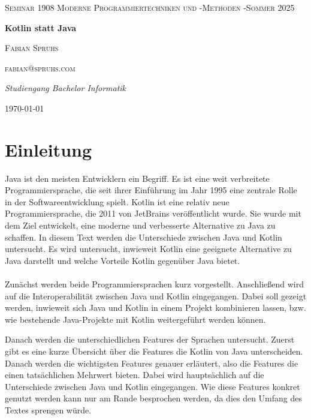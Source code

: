 \documentclass[11pt]{article}
\begin{document}
    \begin{titlepage}
        \centering
        {\scshape\LARGE Seminar 1908 Moderne Programmiertechniken und -Methoden -Sommer 2025 \par}
        \vspace{1cm}
        {\huge\bfseries Kotlin statt Java\par}
        \vspace{1.5cm}
        {\scshape\Large Fabian Spruhs\par}
        {\scshape fabian@spruhs.com\par}
        \vspace{2cm}
        {\Large\itshape Studiengang Bachelor Informatik\par}
        \vspace{2cm}


        {\large \today\par}
    \end{titlepage}

    \tableofcontents
    \newpage


    \section{Einleitung}
    Java ist den meisten Entwicklern ein Begriff.
    Es ist eine weit verbreitete Programmiersprache, die seit ihrer Einführung im Jahr 1995 eine zentrale Rolle in der Softwareentwicklung spielt.
    Kotlin ist eine relativ neue Programmiersprache, die 2011 von JetBrains veröffentlicht wurde.
    Sie wurde mit dem Ziel entwickelt, eine moderne und verbesserte Alternative zu Java zu schaffen.
    In diesem Text werden die Unterschiede zwischen Java und Kotlin untersucht.
    Es wird untersucht, inwieweit Kotlin eine geeignete Alternative zu Java darstellt und welche Vorteile Kotlin gegenüber Java bietet.\\
    \\
    Zunächst werden beide Programmiersprachen kurz vorgestellt.
    Anschließend wird auf die Interoperabilität zwischen Java und Kotlin eingegangen.
    Dabei soll gezeigt werden, inwieweit sich Java und Kotlin in einem Projekt kombinieren lassen, bzw. wie bestehende Java-Projekte mit Kotlin weitergeführt werden können.

    Danach werden die unterschiedlichen Features der Sprachen untersucht.
    Zuerst gibt es eine kurze Übersicht über die Features die Kotlin von Java unterscheiden.
    Danach werden die wichtigsten Features genauer erläutert, also die Features die einen tatsächlichen Mehrwert bieten.
    Dabei wird hauptsächlich auf die Unterschiede zwischen Java und Kotlin eingegangen.
    Wie diese Features konkret genutzt werden kann nur am Rande besprochen werden, da dies den Umfang des Textes sprengen würde.
\end{document}
